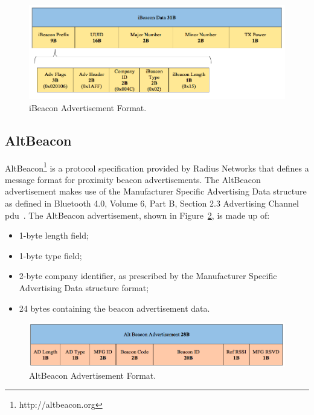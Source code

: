 \begin{figure}[!htb]
  \centering
  \includegraphics[width=1\textwidth]{Figures/ibeacon_v2.png}
  \caption[iBeacon Advertisement Format]{iBeacon Advertisement Format.}
  \label{fig:ibeaconadv}
\end{figure}

\subsection{AltBeacon}
\label{subsection:altbeacon}
AltBeacon\footnote{http://altbeacon.org} is a protocol specification provided by Radius Networks that defines a message format for proximity beacon advertisements. 
The AltBeacon advertisement makes use of the Manufacturer Specific Advertising Data structure as defined in Bluetooth 4.0, Volume 6, Part B, Section 2.3 Advertising Channel \gls{pdu}~\citep{roleofble_altbeacon}.
The AltBeacon advertisement, shown in Figure~\ref{fig:altbeaconadv}, is made up of:
\begin{itemize}
\item 1-byte length field;
\item 1-byte type field;
\item 2-byte company identifier, as prescribed by the Manufacturer Specific Advertising Data structure format;
\item 24 bytes containing the beacon advertisement data.
\end{itemize}

\begin{figure}[!htb]
  \centering
  \includegraphics[width=1\textwidth]{Figures/altbeacon_v2.png}
  \caption[AltBeacon Advertisement Format]{AltBeacon Advertisement Format.}
  \label{fig:altbeaconadv}
\end{figure}

